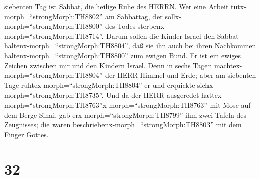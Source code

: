 siebenten Tag ist Sabbat, die heilige Ruhe des HERRN. Wer eine Arbeit
tutx-morph=``strongMorph:TH8802'' am Sabbattag, der
sollx-morph=``strongMorph:TH8800'' des Todes
sterbenx-morph=``strongMorph:TH8714''.  Darum sollen die
Kinder Israel den Sabbat haltenx-morph=``strongMorph:TH8804'', daß sie
ihn auch bei ihren Nachkommen haltenx-morph=``strongMorph:TH8800'' zum
ewigen Bund.  Er ist ein ewiges Zeichen zwischen mir und
den Kindern Israel. Denn in sechs Tagen
machtex-morph=``strongMorph:TH8804'' der HERR Himmel und Erde; aber am
siebenten Tage ruhtex-morph=``strongMorph:TH8804'' er und erquickte
sichx-morph=``strongMorph:TH8735''.  Und da der HERR
ausgeredet
hattex-morph=``strongMorph:TH8763''x-morph=``strongMorph:TH8763'' mit
Mose auf dem Berge Sinai, gab erx-morph=``strongMorph:TH8799'' ihm zwei
Tafeln des Zeugnisses; die waren
beschriebenx-morph=``strongMorph:TH8803'' mit dem Finger Gottes.

\hypertarget{section-31}{%
\section{32}\label{section-31}}

